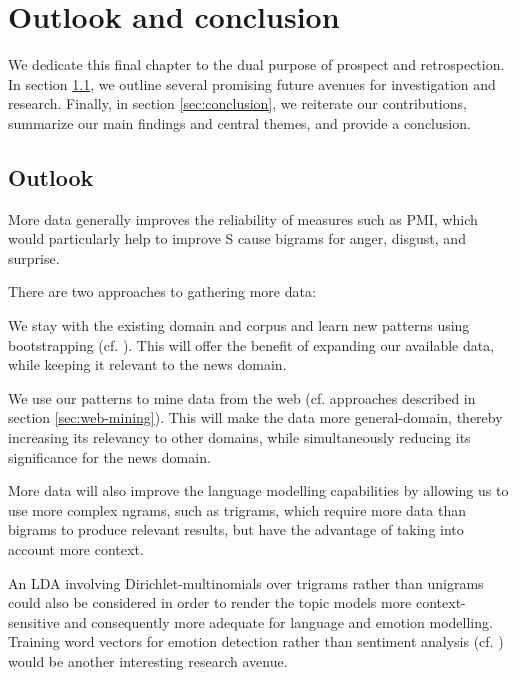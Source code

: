 
\chapter{Outlook and conclusion} %

\label{ch:outlook-conclusion}

We dedicate this final chapter to the dual purpose of prospect and retrospection. In section \ref{sec:outlook}, we outline several promising future avenues for investigation and research. Finally, in section \ref{sec:conclusion}, we reiterate our contributions, summarize our main findings and central themes, and provide a conclusion.

\section{Outlook} \label{sec:outlook}

More data generally improves the reliability of measures such as PMI, which would particularly help to improve S cause bigrams for anger, disgust, and surprise. \begin{inparaenum} There are two approaches to gathering more data: \item We stay with the existing domain and corpus and learn new patterns using bootstrapping (cf. \cite{harvesting_ontologizing}). This will offer the benefit of expanding our available data, while keeping it relevant to the news domain. \item We use our patterns to mine data from the web  (cf. approaches described in section \ref{sec:web-mining}). This will make the data more general-domain, thereby increasing its relevancy to other domains, while simultaneously reducing its significance for the news domain. \end{inparaenum}

More data will also improve the language modelling capabilities by allowing us to use more complex ngrams, such as trigrams, which require more data than bigrams to produce relevant results, but have the advantage of taking into account more context.

An LDA involving Dirichlet-multinomials over trigrams rather than unigrams could also be considered in order to render the topic models more context-sensitive and consequently more adequate for language and emotion modelling. Training word vectors for emotion detection rather than sentiment analysis (cf. \cite{word_vectors_sentiment}) would be another interesting research avenue.

